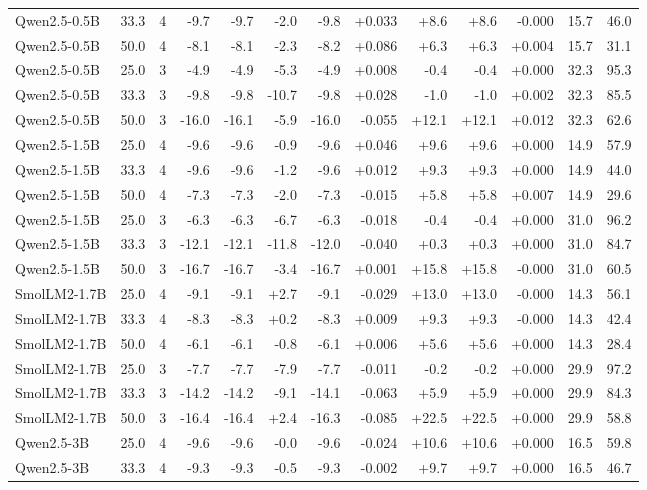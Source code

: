 \documentclass{article}
\begin{document}
\begin{longtable}{lrrrrrrrrrrrr}
Qwen2.5-0.5B & 33.3 & 4 & -9.7 & -9.7 & -2.0 & -9.8 & +0.033 & +8.6 & +8.6 & -0.000 & 15.7 & 46.0 \\
Qwen2.5-0.5B & 50.0 & 4 & -8.1 & -8.1 & -2.3 & -8.2 & +0.086 & +6.3 & +6.3 & +0.004 & 15.7 & 31.1 \\
Qwen2.5-0.5B & 25.0 & 3 & -4.9 & -4.9 & -5.3 & -4.9 & +0.008 & -0.4 & -0.4 & +0.000 & 32.3 & 95.3 \\
Qwen2.5-0.5B & 33.3 & 3 & -9.8 & -9.8 & -10.7 & -9.8 & +0.028 & -1.0 & -1.0 & +0.002 & 32.3 & 85.5 \\
Qwen2.5-0.5B & 50.0 & 3 & -16.0 & -16.1 & -5.9 & -16.0 & -0.055 & +12.1 & +12.1 & +0.012 & 32.3 & 62.6 \\
Qwen2.5-1.5B & 25.0 & 4 & -9.6 & -9.6 & -0.9 & -9.6 & +0.046 & +9.6 & +9.6 & +0.000 & 14.9 & 57.9 \\
Qwen2.5-1.5B & 33.3 & 4 & -9.6 & -9.6 & -1.2 & -9.6 & +0.012 & +9.3 & +9.3 & +0.000 & 14.9 & 44.0 \\
Qwen2.5-1.5B & 50.0 & 4 & -7.3 & -7.3 & -2.0 & -7.3 & -0.015 & +5.8 & +5.8 & +0.007 & 14.9 & 29.6 \\
Qwen2.5-1.5B & 25.0 & 3 & -6.3 & -6.3 & -6.7 & -6.3 & -0.018 & -0.4 & -0.4 & +0.000 & 31.0 & 96.2 \\
Qwen2.5-1.5B & 33.3 & 3 & -12.1 & -12.1 & -11.8 & -12.0 & -0.040 & +0.3 & +0.3 & +0.000 & 31.0 & 84.7 \\
Qwen2.5-1.5B & 50.0 & 3 & -16.7 & -16.7 & -3.4 & -16.7 & +0.001 & +15.8 & +15.8 & -0.000 & 31.0 & 60.5 \\
SmolLM2-1.7B & 25.0 & 4 & -9.1 & -9.1 & +2.7 & -9.1 & -0.029 & +13.0 & +13.0 & -0.000 & 14.3 & 56.1 \\
SmolLM2-1.7B & 33.3 & 4 & -8.3 & -8.3 & +0.2 & -8.3 & +0.009 & +9.3 & +9.3 & -0.000 & 14.3 & 42.4 \\
SmolLM2-1.7B & 50.0 & 4 & -6.1 & -6.1 & -0.8 & -6.1 & +0.006 & +5.6 & +5.6 & +0.000 & 14.3 & 28.4 \\
SmolLM2-1.7B & 25.0 & 3 & -7.7 & -7.7 & -7.9 & -7.7 & -0.011 & -0.2 & -0.2 & +0.000 & 29.9 & 97.2 \\
SmolLM2-1.7B & 33.3 & 3 & -14.2 & -14.2 & -9.1 & -14.1 & -0.063 & +5.9 & +5.9 & +0.000 & 29.9 & 84.3 \\
SmolLM2-1.7B & 50.0 & 3 & -16.4 & -16.4 & +2.4 & -16.3 & -0.085 & +22.5 & +22.5 & +0.000 & 29.9 & 58.8 \\
Qwen2.5-3B & 25.0 & 4 & -9.6 & -9.6 & -0.0 & -9.6 & -0.024 & +10.6 & +10.6 & +0.000 & 16.5 & 59.8 \\
Qwen2.5-3B & 33.3 & 4 & -9.3 & -9.3 & -0.5 & -9.3 & -0.002 & +9.7 & +9.7 & +0.000 & 16.5 & 46.7 \\

\end{longtable}
\end{document}
